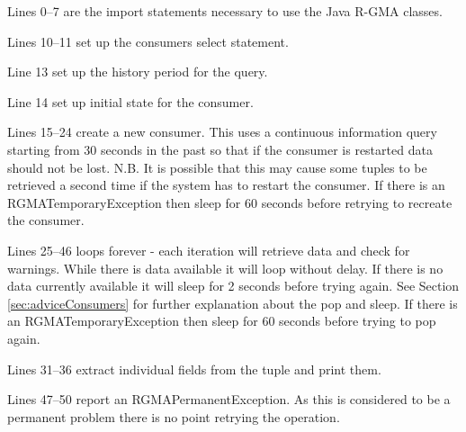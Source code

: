 

Lines 0--7 are the import statements necessary to use the Java R-GMA
classes.

Lines 10--11 set up the consumers select statement.

Line 13 set up the history period for the query.

Line 14 set up initial state for the consumer.

Lines 15--24 create a new consumer. This uses a continuous information
query starting from 30 seconds in the past so that if the consumer is
restarted data should not be lost. N.B. It is possible that this may
cause some tuples to be retrieved a second time if the system has to
restart the consumer. If there is an RGMATemporaryException then sleep
for 60 seconds before retrying to recreate the consumer.

Lines 25--46 loops forever - each iteration will retrieve data and
check for warnings. While there is data available it will loop without
delay. If there is no data currently available it will sleep for 2
seconds before trying again. See Section \ref{sec:adviceConsumers} for
further explanation about the pop and sleep. If there is an
RGMATemporaryException then sleep for 60 seconds before trying to pop
again.

Lines 31--36 extract individual fields from the tuple and print them.

Lines 47--50 report an RGMAPermanentException. As this is considered
to be a permanent problem there is no point retrying the operation.
